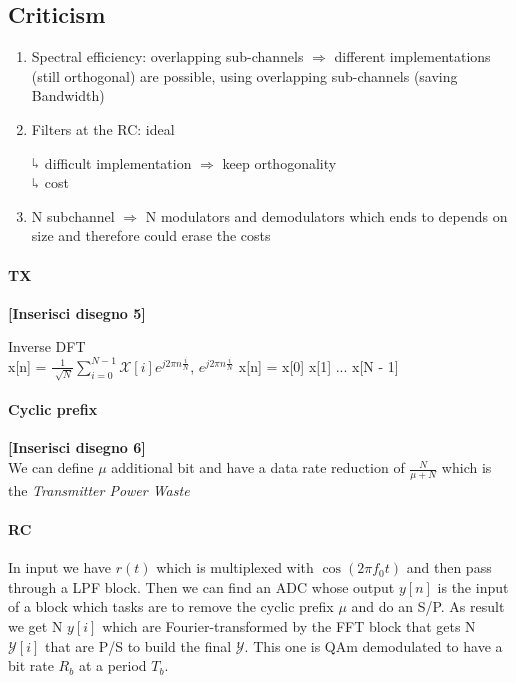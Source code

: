 \subsection{Criticism}
\begin{enumerate}
\item Spectral efficiency: overlapping sub-channels $\Rightarrow$ different implementations (still orthogonal) are possible, using overlapping sub-channels (saving Bandwidth)
\item Filters at the RC: ideal

$\rotatebox[origin=c]{180}{$\Lsh$}$  difficult implementation $\Rightarrow$ keep orthogonality\\
$\rotatebox[origin=c]{180}{$\Lsh$}$ cost
\item N subchannel $\Rightarrow$ N modulators and demodulators which ends to depends on size and therefore could erase the costs
\end{enumerate}

\paragraph{TX}
\textbf{[Inserisci disegno 5]}

\begin{definition}{Inverse DFT}\\
x[n] = $\frac{1}{\sqrt[]{N}}\sum\limits_{i = 0}^{N - 1}\mathcal{X}[i]e^{j2\pi n\frac{i}{N}}$,  $e^{j2\pi n\frac{i}{N}}$  x[n] = x[0] x[1] ... x[N - 1] 
\end{definition}

\paragraph{Cyclic prefix}
\textbf{[Inserisci disegno 6]}\\
We can define $\mu$ additional bit and have a data rate reduction of $\frac{N}{\mu + N}$ which is the \textit{Transmitter Power Waste}

\paragraph{RC}
In input we have $r(t)$ which is multiplexed with $\cos(2\pi f_0t)$ and then pass through a LPF block. Then we can find an ADC whose output $y[n]$ is the input of a block which tasks are to remove the cyclic prefix $\mu$ and do an S/P. As result we get N $y[i]$ which are Fourier-transformed by the FFT block that gets N $\mathcal{Y}[i]$ that are P/S to build the final $\mathcal{Y}$. This one is QAm demodulated to have a bit rate $R_b$ at a period $T_b$.


